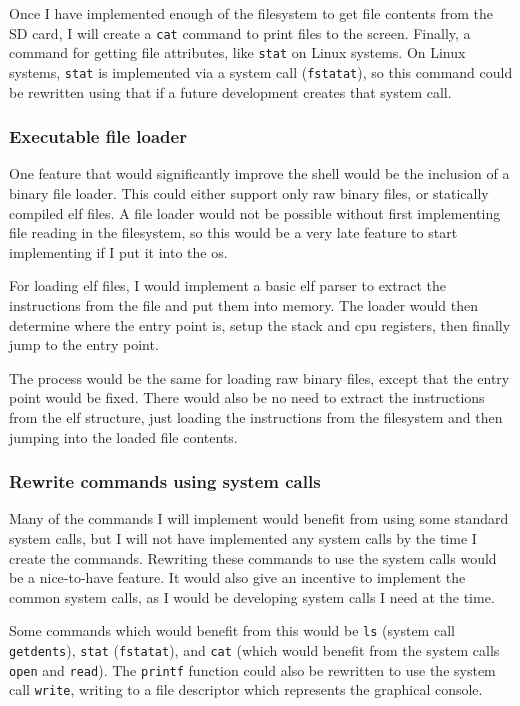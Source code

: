 \documentclass{article}
\begin{document}
Once I have implemented enough of the filesystem to get file contents from the
SD card, I will create a \texttt{cat} command to print files to the screen.
Finally, a command for getting file attributes, like \texttt{stat} on Linux
systems. On Linux systems, \texttt{stat} is implemented via a system call
(\texttt{fstatat}), so this command could be rewritten using that if a future
development creates that system call.

\subsubsection{Executable file loader}
One feature that would significantly improve the shell would be the inclusion
of a binary file loader. This could either support only raw binary files, or
statically compiled \gls{elf} files. A file loader would not be possible
without first implementing file reading in the filesystem, so this would be a
very late feature to start implementing if I put it into the \gls{os}.

For loading \gls{elf} files, I would implement a basic \gls{elf} parser to
extract the instructions from the file and put them into memory. The loader
would then determine where the entry point is, setup the stack and \gls{cpu}
registers, then finally jump to the entry point.

The process would be the same for loading raw binary files, except that the
entry point would be fixed. There would also be no need to extract the
instructions from the \gls{elf} structure, just loading the instructions from
the filesystem and then jumping into the loaded file contents.

\subsubsection{Rewrite commands using system calls}
Many of the commands I will implement would benefit from using some standard
system calls, but I will not have implemented any system calls by the time I
create the commands. Rewriting these commands to use the system calls would be
a nice-to-have feature. It would also give an incentive to implement the
common system calls, as I would be developing system calls I need at the time.

Some commands which would benefit from this would be \texttt{ls} (system call
\texttt{getdents}), \texttt{stat} (\texttt{fstatat}), and \texttt{cat} (which
would benefit from the system calls \texttt{open} and \texttt{read}). The
\texttt{printf} function could also be rewritten to use the system call
\texttt{write}, writing to a file descriptor which represents the graphical
console.
\end{document}
